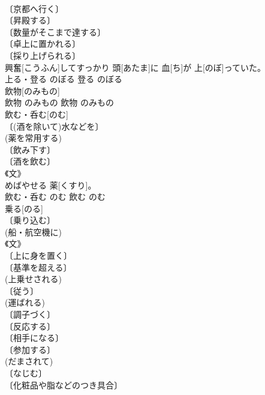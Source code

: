 \documentclass[8pt]{extreport}
\begin{document}
\begin{CJK}{UTF8}{min}
\\	〔京都へ行く〕 
\\	〔昇殿する〕 
\\	〔数量がそこまで達する〕 
\\	〔卓上に置かれる〕 
\\	〔採り上げられる〕 
\\	興奮[こうふん]してすっかり 頭[あたま]に 血[ち]が 上[のぼ]っていた。	
\\	上る・登る	のぼる	登る	のぼる	
\\	飲物[のみもの]	
\\	飲物	のみもの	飲物	のみもの	
\\	飲む・呑む[のむ]	
\\	〔(酒を除いて)水などを〕 
\\	(薬を常用する) 
\\	〔飲み下す〕 
\\	〔酒を飲む〕 
\\	《文》 
\\	[⇒のめる１ 
\\	〔喫煙する〕 
\\	〔大きなものが小さなものを中に取り込む〕 
\\	[⇒のまれる 
\\	〔表に出さずこらえる〕 
\\	〔(提議などを)受諾する〕 
\\	〔軽視する〕 
\\	[⇒のまれる 
\\	〔隠し持つ〕 
\\	飲[の]めばやせる 薬[くすり]。	
\\	飲む・呑む	のむ	飲む	のむ	
\\	乗る[のる]	
\\	〔乗り込む〕 
\\	(船・航空機に) 
\\	《文》 
\\	〔上に身を置く〕 
\\	〔基準を超える〕 
\\	(上乗せされる) 
\\	〔従う〕 
\\	(運ばれる) 
\\	〔調子づく〕 
\\	〔反応する〕 
\\	〔相手になる〕 
\\	〔参加する〕 
\\	(だまされて) 
\\	〔なじむ〕 
\\	〔化粧品や脂などのつき具合〕 

\end{CJK}
\end{document}
